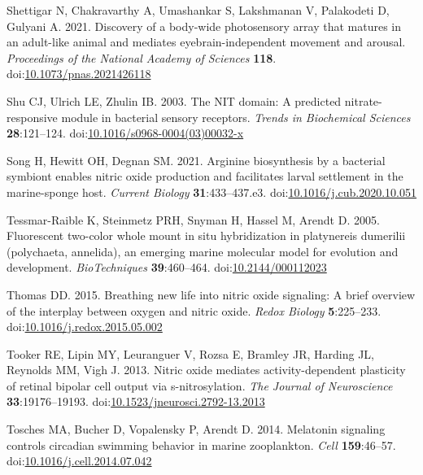 \documentclass[
  11pt,
  letterpaper,
  DIV=11,
  numbers=noendperiod]{scrartcl}
\newlength{\cslhangindent}
\newenvironment{CSLReferences}[2] %
 {\begin{list}{}{%
  \setlength{\itemindent}{0pt}
  \setlength{\leftmargin}{0pt}
  \setlength{\parsep}{0pt}
  \ifodd #1
   \setlength{\leftmargin}{\cslhangindent}
   \setlength{\itemindent}{-1\cslhangindent}
  \fi
  \setlength{\itemsep}{#2\baselineskip}}}
 {\end{list}}
\begin{document}
\begin{CSLReferences}{1}{0}
Shettigar N, Chakravarthy A, Umashankar S, Lakshmanan V, Palakodeti D,
Gulyani A. 2021. Discovery of a body-wide photosensory array that
matures in an adult-like animal and mediates
eye{\textendash}brain-independent movement and arousal.
\emph{Proceedings of the National Academy of Sciences} \textbf{118}.
doi:\href{https://doi.org/10.1073/pnas.2021426118}{10.1073/pnas.2021426118}

Shu CJ, Ulrich LE, Zhulin IB. 2003. The NIT domain: A predicted
nitrate-responsive module in bacterial sensory receptors. \emph{Trends
in Biochemical Sciences} \textbf{28}:121--124.
doi:\href{https://doi.org/10.1016/s0968-0004(03)00032-x}{10.1016/s0968-0004(03)00032-x}

Song H, Hewitt OH, Degnan SM. 2021. Arginine biosynthesis by a bacterial
symbiont enables nitric oxide production and facilitates larval
settlement in the marine-sponge host. \emph{Current Biology}
\textbf{31}:433--437.e3.
doi:\href{https://doi.org/10.1016/j.cub.2020.10.051}{10.1016/j.cub.2020.10.051}

Tessmar-Raible K, Steinmetz PRH, Snyman H, Hassel M, Arendt D. 2005.
Fluorescent two-color whole mount in situ hybridization in platynereis
dumerilii (polychaeta, annelida), an emerging marine molecular model for
evolution and development. \emph{BioTechniques} \textbf{39}:460--464.
doi:\href{https://doi.org/10.2144/000112023}{10.2144/000112023}

Thomas DD. 2015. Breathing new life into nitric oxide signaling: A brief
overview of the interplay between oxygen and nitric oxide. \emph{Redox
Biology} \textbf{5}:225--233.
doi:\href{https://doi.org/10.1016/j.redox.2015.05.002}{10.1016/j.redox.2015.05.002}

Tooker RE, Lipin MY, Leuranguer V, Rozsa E, Bramley JR, Harding JL,
Reynolds MM, Vigh J. 2013. Nitric oxide mediates activity-dependent
plasticity of retinal bipolar cell output via s-nitrosylation. \emph{The
Journal of Neuroscience} \textbf{33}:19176--19193.
doi:\href{https://doi.org/10.1523/jneurosci.2792-13.2013}{10.1523/jneurosci.2792-13.2013}

Tosches MA, Bucher D, Vopalensky P, Arendt D. 2014. Melatonin signaling
controls circadian swimming behavior in marine zooplankton. \emph{Cell}
\textbf{159}:46--57.
doi:\href{https://doi.org/10.1016/j.cell.2014.07.042}{10.1016/j.cell.2014.07.042}


\end{CSLReferences}
\end{document}

